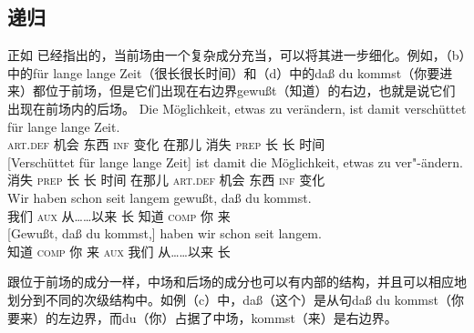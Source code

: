 \subsection{递归}
\label{sec-topo-rekursion}
正如 \citet[]{Reis80a}已经指出的，当前场由一个复杂成分充当，可以将其进一步细化。例如，（b）中的für lange lange Zeit（很长很长时间）和（d）中的daß du kommst（你要进来）都位于前场，但是它们出现在右边界gewußt（知道）的右边，也就是说它们出现在前场内的后场。
\eal
\label{Beispiel-topologisch-komplexes-Vorfeld}
\ex
\gll Die Möglichkeit, etwas zu verändern, ist damit verschüttet für lange lange Zeit.\\
	 \textsc{art}.\textsc{def} 机会 东西 \textsc{inf} 变化 \passiveprs{} 在那儿 消失 \textsc{prep} 长 长 时间\\
\ex 
\gll {}[Verschüttet für lange lange Zeit] ist damit die Möglichkeit,      etwas zu ver"-ändern.\\
      \spacebr{}消失 \textsc{prep} 长 长 时间 \passiveprs{} 在那儿 \textsc{art}.\textsc{def} 机会  东西 \textsc{inf} 变化\\
\ex 
\gll Wir haben        schon       seit          langem gewußt, daß du kommst.\\
     我们 \textsc{aux} \particle{} 从……以来 长     知道     \textsc{comp} 你 来\\
\ex 
\gll {}[Gewußt, daß du kommst,] haben wir schon seit langem.\\
	 \spacebr{}知道 \textsc{comp} 你 来 \textsc{aux} 我们 \particle{} 从……以来 长\\
\zl


\noindent
跟位于前场的成分一样，中场和后场的成分也可以有内部的结构，并且可以相应地划分到不同的次级结构中。如例（c）中，daß（这个）是从句daß du kommst（你要来）的左边界，而du（你）占据了中场，kommst（来）是右边界。


